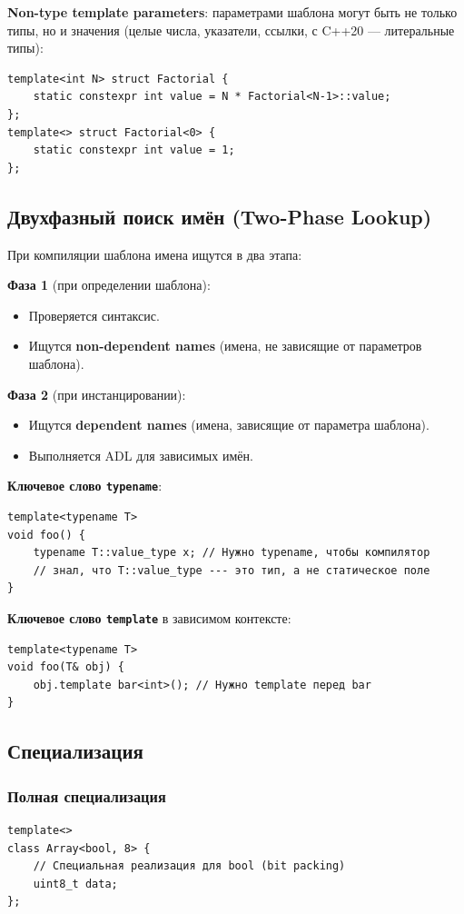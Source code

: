 \documentclass[12pt,a4paper]{article}
\begin{document}
\textbf{Non-type template parameters}: параметрами шаблона могут быть не только типы, но и значения (целые числа, указатели, ссылки, с C++20 --- литеральные типы):
\begin{lstlisting}
template<int N> struct Factorial {
    static constexpr int value = N * Factorial<N-1>::value;
};
template<> struct Factorial<0> {
    static constexpr int value = 1;
};
\end{lstlisting}

\subsection{Двухфазный поиск имён (Two-Phase Lookup)}

При компиляции шаблона имена ищутся в два этапа:

\textbf{Фаза 1} (при определении шаблона):
\begin{itemize}
    \item Проверяется синтаксис.
    \item Ищутся \textbf{non-dependent names} (имена, не зависящие от параметров шаблона).
\end{itemize}

\textbf{Фаза 2} (при инстанцировании):
\begin{itemize}
    \item Ищутся \textbf{dependent names} (имена, зависящие от параметра шаблона).
    \item Выполняется ADL для зависимых имён.
\end{itemize}

\textbf{Ключевое слово \texttt{typename}}:
\begin{lstlisting}
template<typename T>
void foo() {
    typename T::value_type x; // Нужно typename, чтобы компилятор
    // знал, что T::value_type --- это тип, а не статическое поле
}
\end{lstlisting}

\textbf{Ключевое слово \texttt{template}} в зависимом контексте:
\begin{lstlisting}
template<typename T>
void foo(T& obj) {
    obj.template bar<int>(); // Нужно template перед bar
}
\end{lstlisting}

\subsection{Специализация}

\subsubsection{Полная специализация}
\begin{lstlisting}
template<>
class Array<bool, 8> {
    // Специальная реализация для bool (bit packing)
    uint8_t data;
};
\end{lstlisting}
\end{document}

